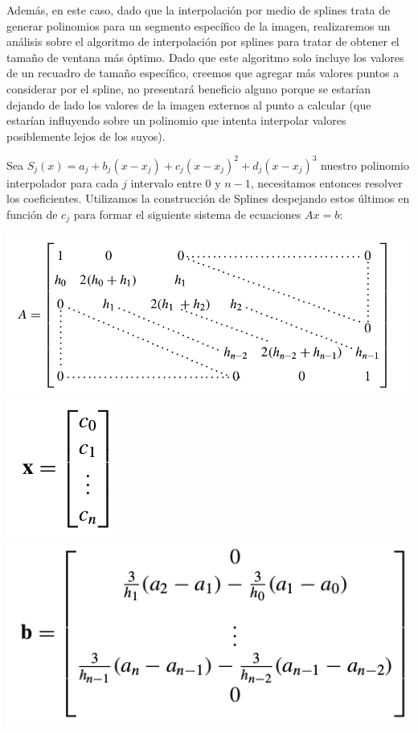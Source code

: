 Además, en este caso, dado que la interpolación por medio de splines trata de generar polinomios para un segmento
específico de la imagen, realizaremos un análisis sobre el algoritmo de interpolación por splines para tratar de obtener el tamaño de ventana más óptimo. Dado que este algoritmo solo incluye los valores de un recuadro de tamaño específico, creemos que agregar más valores puntos a considerar por el spline, no presentará beneficio alguno porque se estarían dejando de lado los valores de la imagen externos al punto a calcular (que estarían influyendo sobre un polinomio que intenta interpolar valores posiblemente lejos de los suyos).

Sea $S_{j}(x) = a_{j} + b_{j}(x - x_{j}) + c_{j}(x - x_{j})^2 + d_{j}(x - x_{j})^3$ nuestro polinomio interpolador para cada $j$ intervalo entre $0$ y $n-1$, necesitamos entonces resolver los coeficientes. Utilizamos la construcción de Splines despejando estos últimos en función de $c_{j}$ para formar el siguiente sistema de ecuaciones $Ax = b$:

\begin{center}
\includegraphics[scale=0.50]{imagenes/A.png}
\includegraphics[scale=0.50]{imagenes/x.png}
\includegraphics[scale=0.50]{imagenes/b.png}
\end{center}

